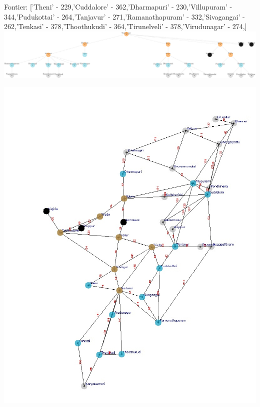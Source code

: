 \documentclass[xcolor=table]{beamer}
\begin{document}
\begin{frame}
  { \tiny Fontier: ['Theni' - 229,'Cuddalore' - 362,'Dharmapuri' - 230,'Villupuram' - 344,'Pudukottai' - 264,'Tanjavur' - 271,'Ramanathapuram' - 332,'Sivagangai' - 262,'Tenkasi' - 378,'Thoothukudi' - 364,'Tirunelveli' - 378,'Virudunagar' - 274,] }
  \includegraphics[width=1\textwidth]{../UCSNodes/15-1.png}
  \begin{center}
    \includegraphics[height=0.55\textheight]{../UCSoutput/tamilUCS13.jpg}
  \end{center}
\end{frame}
\end{document}
